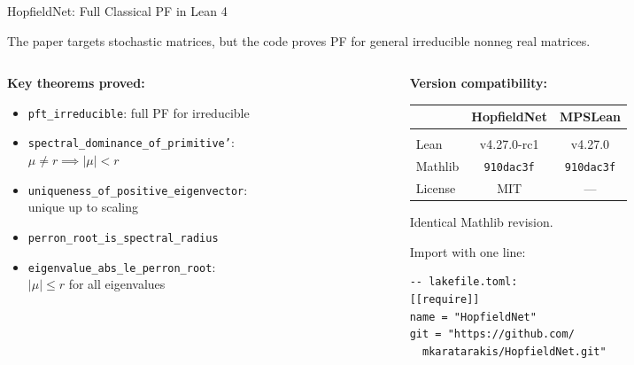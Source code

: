 \documentclass[aspectratio=169,10pt]{beamer}
\begin{document}
\begin{frame}[fragile]{HopfieldNet: Full Classical PF in Lean 4}

The paper targets stochastic matrices, but the code proves PF for \alert{general irreducible nonneg real matrices}.

\vspace{0.3em}
\begin{columns}[T]
\begin{column}{0.48\textwidth}
\textbf{Key theorems proved:}
\begin{itemize}\small
  \item \texttt{pft\_irreducible}: full PF for irreducible
  \item \texttt{spectral\_dominance\_of\_primitive'}: \\$\mu \neq r \implies |\mu| < r$
  \item \texttt{uniqueness\_of\_positive\_eigenvector}: \\unique up to scaling
  \item \texttt{perron\_root\_is\_spectral\_radius}
  \item \texttt{eigenvalue\_abs\_le\_perron\_root}: \\$|\mu| \leq r$ for all eigenvalues
\end{itemize}
\end{column}
\begin{column}{0.48\textwidth}
\textbf{Version compatibility:}

\vspace{0.3em}
\begin{tabular}{lcc}
  & \textbf{HopfieldNet} & \textbf{MPSLean} \\
  \hline\\
  Lean & v4.27.0-rc1 & v4.27.0 \\
  Mathlib & \texttt{910dac3f} & \texttt{910dac3f} \\
  License & MIT & --- \\
\end{tabular}

\vspace{0.5em}
\textcolor{leangreen}{Identical Mathlib revision.}

\vspace{0.3em}
Import with one line:
\begin{lstlisting}
-- lakefile.toml:
[[require]]
name = "HopfieldNet"
git = "https://github.com/
  mkaratarakis/HopfieldNet.git"
\end{lstlisting}
\end{column}
\end{columns}
\end{frame}
\end{document}
